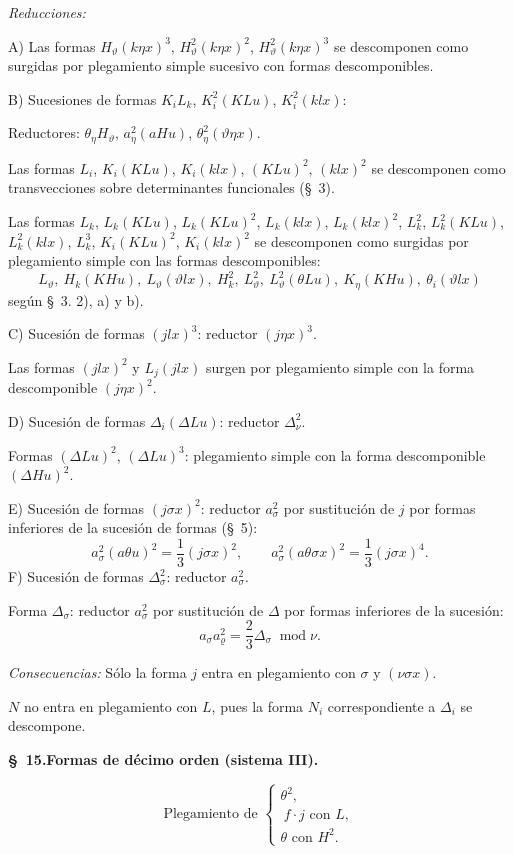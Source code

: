 \documentclass[11pt]{article}
\newcommand{\A}{\Delta}
\newcommand{\R}{\varrho}
\newcommand{\modu}[1]{\;\operatorname{mod} #1}
\begin{document}
\noindent\emph{Reducciones:}

A) Las formas $H_\vartheta(k\eta x)^3$, $H_\vartheta^2(k\eta x)^2$, $H_\vartheta^2(k\eta x)^3$ se descomponen como surgidas por plegamiento simple sucesivo con formas descomponibles.

B) Sucesiones de formas $K_iL_k$, $K_i^2(KLu)$, $K_i^2(klx)$:

Reductores: $\theta_\eta H_\vartheta$, $a_\eta^2(aHu)$, $\theta_\eta^2(\vartheta\eta x)$.

Las formas $L_i$, $K_i(KLu)$, $K_i(klx)$, $(KLu)^2$, $(klx)^2$ se descomponen como transvecciones sobre determinantes funcionales (\S\ 3).

Las formas $L_k$, $L_k(KLu)$, $L_k(KLu)^2$, $L_k(klx)$, $L_k(klx)^2$, $L_k^2$, $L_k^2(KLu)$, $L_k^2(klx)$, $L_k^3$, $K_i(KLu)^2$, $K_i(klx)^2$ se descomponen como surgidas por plegamiento simple con las formas descomponibles:
\[
L_\vartheta,
\ H_k(KHu),
\ L_\vartheta(\vartheta lx),
\ H_k^2,
\ L_\vartheta^2,
\ L_\vartheta^2(\theta Lu),
\ K_\eta(KHu),
\ \theta_i(\vartheta lx)
\]
según \S\ 3. 2), a) y b).

C) Sucesión de formas $(jlx)^3$: reductor $(j\eta x)^3$.

Las formas $(jlx)^2$ y $L_j(jlx)$ surgen por plegamiento simple con la forma descomponible $(j\eta x)^2$.

D) Sucesión de formas $\A_i(\A Lu)$: reductor $\A_\nu^2$.

Formas $(\A Lu)^2$, $(\A Lu)^3$: plegamiento simple con la forma descomponible $(\A Hu)^2$.

E) Sucesión de formas $(j\sigma x)^2$: reductor $a_\sigma^2$ por sustitución de $j$ por formas inferiores de la sucesión de formas (\S\ 5):
\[
a_\sigma^2(a\theta u)^2=\frac13(j\sigma x)^2,
\qquad
a_\sigma^2(a\theta\sigma x)^2=\frac13(j\sigma x)^4.
\]
F) Sucesión de formas $\A_\sigma^2$: reductor $a_\sigma^2$.

Forma $\A_\sigma$: reductor $a_\sigma^2$ por sustitución de $\A$ por formas inferiores de la sucesión:
\[
a_\sigma a_\R^2=\frac23\A_\sigma\modu{\nu}.
\]

\noindent\emph{Consecuencias:} Sólo la forma $j$ entra en plegamiento con $\sigma$ y $(\nu\sigma x)$.

$N$ no entra en plegamiento con $L$, pues la forma $N_i$ correspondiente a $\A_i$ se descompone.

\begin{center}
\textbf{\S\ 15.\quad Formas de décimo orden (sistema III).}
\end{center}
\[
\text{Plegamiento de }\left\{\begin{array}{l}
\theta^2,\\
\ f\cdot j\text{ con }L,\\
\theta\text{ con }H^2.
\end{array}\right.
\]
\end{document}
